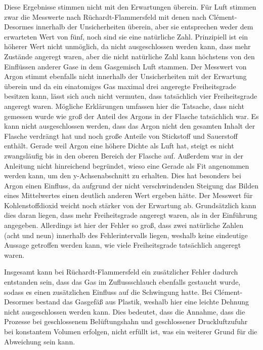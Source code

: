 \documentclass[
	a4paper,
	12pt,
	pagesize,
	ngerman
]{scrartcl}
\begin{document}
	Diese Ergebnisse stimmen nicht mit den Erwartungen überein.
	Für Luft stimmen zwar die Messwerte nach Rüchardt-Flammersfeld mit denen nach Clément-Desormes innerhalb der Unsicherheiten überein, aber sie entsprechen weder dem erwarteten Wert von fünf, noch sind sie eine natürliche Zahl.
	Prinzipiell ist ein höherer Wert nicht unmöglich, da nicht ausgeschlossen werden kann, dass mehr Zustände angeregt waren, aber die nicht natürliche Zahl kann höchstens von den Einflüssen anderer Gase in dem Gasgemisch Luft stammen.
	Der Messwert von Argon stimmt ebenfalls nicht innerhalb der Unsicherheiten mit der Erwartung überein und da ein einatomiges Gas maximal drei angeregte Freiheitsgrade besitzen kann, lässt sich auch nicht vermuten, dass tatsächlich vier Freiheitsgrade angeregt waren.
	Mögliche Erklärungen umfassen hier die Tatsache, dass nicht gemessen wurde wie groß der Anteil des Argons in der Flasche tatsächlich war.
	Es kann nicht ausgeschlossen werden, dass das Argon nicht den gesamten Inhalt der Flasche verdrängt hat und noch große Anteile von Stickstoff und Sauerstoff enthält.
	Gerade weil Argon eine höhere Dichte als Luft hat, steigt es nicht zwangsläufig bis in den oberen Bereich der Flasche auf.
	Außerdem war in der Anleitung nicht hinreichend begründet, wieso eine Gerade als Fit angenommen werden kann, um den y-Achsenabschnitt zu erhalten.
	Dies hat besonders bei Argon einen Einfluss, da aufgrund der nicht verschwindenden Steigung das Bilden eines Mittelwertes einen deutlich anderen Wert ergeben hätte.
	Der Messwert für Kohlenstoffdioxid weicht noch stärker von der Erwartung ab.
	Grundsätzlich kann dies daran liegen, dass mehr Freiheitsgrade angeregt waren, als in der Einführung angegeben.
	Allerdings ist hier der Fehler so groß, dass zwei natürliche Zahlen (acht und neun) innerhalb des Fehlerintervalls liegen, weshalb keine eindeutige Aussage getroffen werden kann, wie viele Freiheitsgrade tatsächlich angeregt waren.
	
	Insgesamt kann bei Rüchardt-Flammersfeld ein zusätzlicher Fehler dadurch entstanden sein, dass das Gas im Zuflussschlauch ebenfalls gestaucht wurde, sodass es einen zusätzlichen Einfluss auf die Schwingung hatte.
	Bei Clément-Desormes bestand das Gasgefäß aus Plastik, weshalb hier eine leichte Dehnung nicht ausgeschlossen werden kann.
	Dies bedeutet, dass die Annahme, dass die Prozesse bei geschlossenem Belüftungshahn und geschlossener Druckluftzufuhr bei konstantem Volumen erfolgen, nicht erfüllt ist, was ein weiterer Grund für die Abweichung sein kann.
	
\end{document}
